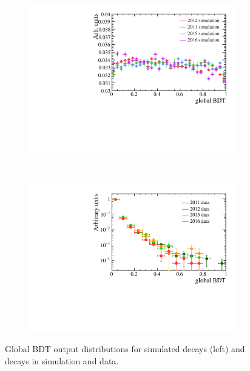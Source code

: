 \begin{figure}[htbp]
    \centering
    \begin{subfigure}[b]{0.48\textwidth}
        \includegraphics[width=\textwidth]{./Figs/Selection/BDTflat_signal.pdf}
    \end{subfigure}
    ~ %
    \begin{subfigure}[b]{0.48\textwidth}
       \includegraphics[width=\textwidth]{./Figs/Selection/BDTflat_bkgnd.pdf}
    \end{subfigure}
    \caption{Global BDT output distributions for \bsmumu simulated decays (left) and \bbbarmumux decays in simulation and data.}
    \label{fig:FlatteningBDT}
\end{figure}


